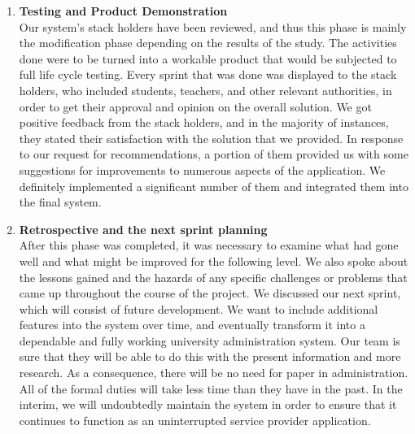 \begin{enumerate}
\item \textbf{Testing and Product Demonstration}\\

Our system's stack holders have been reviewed, and thus this phase is mainly the modification phase depending on the results of the study. The activities done were to be turned into a workable product that would be subjected to full life cycle testing. Every sprint that was done was displayed to the stack holders, who included students, teachers, and other relevant authorities, in order to get their approval and opinion on the overall solution. We got positive feedback from the stack holders, and in the majority of instances, they stated their satisfaction with the solution that we provided. In response to our request for recommendations, a portion of them provided us with some suggestions for improvements to numerous aspects of the application. We definitely implemented a significant number of them and integrated them into the final system.

\item \textbf{Retrospective and the next sprint planning}\\

After this phase was completed, it was necessary to examine what had gone well and what might be improved for the following level. We also spoke about the lessons gained and the hazards of any specific challenges or problems that came up throughout the course of the project. We discussed our next sprint, which will consist of future development. We want to include additional features into the system over time, and eventually transform it into a dependable and fully working university administration system. Our team is sure that they will be able to do this with the present information and more research. As a consequence, there will be no need for paper in administration. All of the formal duties will take less time than they have in the past. In the interim, we will undoubtedly maintain the system in order to ensure that it continues to function as an uninterrupted service provider application.


\end{enumerate}

